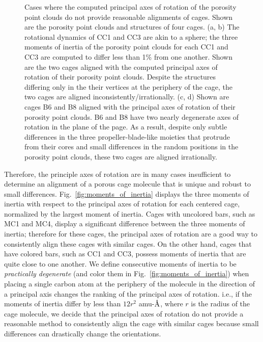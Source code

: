 \documentclass[journal=jacsat,manuscript=article]{achemso}
\newcommand{\angstrom}{\mbox{\normalfont\AA}}
\begin{document}
{\begin{figure}
	\caption{{\color{red} Cases where the computed principal axes of rotation of the porosity point clouds do not provide reasonable alignments of cages. Shown are the porosity point clouds and structures of four cages. (a, b) The rotational dynamics of CC1 and CC3 are akin to a sphere; the three moments of inertia of the porosity point clouds for each CC1 and CC3 are computed to differ less than 1\% from one another. Shown are the two cages aligned with the computed principal axes of rotation of their porosity point clouds. Despite the structures differing only in the their vertices at the periphery of the cage, the two cages are aligned inconsistently/irrationally. (c, d) Shown are cages B6 and B8 aligned with the principal axes of rotation of their porosity point clouds. B6 and B8 have two nearly degenerate axes of rotation in the plane of the page. As a result, despite only subtle differences in the three propeller-blade-like moieties that protrude from their cores and small differences in the random positions in the porosity point clouds, these two cages are aligned irrationally.
	}%
	} \label{fig:misaligned}
\end{figure}

Therefore, the principle axes of rotation are in many cases insufficient to determine an alignment of a porous cage molecule that is unique and robust to small differences. Fig.~\ref{fig:moments_of_inertia} displays the three moments of inertia with respect to the principal axes of rotation for each centered cage, normalized by the largest moment of inertia. Cages with uncolored bars, such as MC1 and MC4, display a significant difference between the three moments of inertia; therefore for these cages, the  principal axes of rotation are a good way to consistently align these cages with similar cages. On the other hand, cages that have colored bars, such as CC1 and CC3, possess moments of inertia that are quite close to one another. We define consecutive moments of inertia to be \emph{practically degenerate} (and color them in Fig.~\ref{fig:moments_of_inertia}) when placing a single carbon atom at the periphery of the molecule in the direction of a principal axis changes the ranking of the principal axes of rotation. i.e., if the moments of inertia differ by less than $12 r^2$ amu-$\angstrom$, where $r$ is the radius of the cage molecule, we decide that the principal axes of rotation do not provide a reasonable method to consistently align the cage with similar cages because small differences can drastically change the orientations.

}
\end{document}

